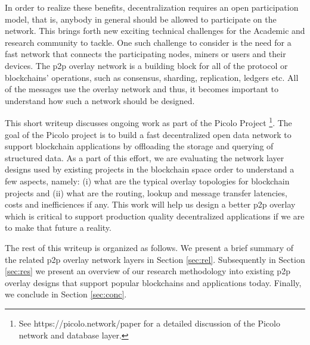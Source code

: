 \documentclass[journal]{IEEEtran}
\begin{document}
In order to realize these benefits, decentralization requires an open participation model, that is, anybody in general
should be allowed to participate on the network. This brings forth new exciting technical challenges for the Academic
and research community to tackle. One such challenge to consider is the need for a fast network that connects the
participating nodes, miners or users and their devices. The p2p overlay network \cite{p2p_survey}
is a building block for all of the protocol or blockchains' operations, such as consensus, sharding, replication,
ledgers etc. All of the messages use the overlay network and thus, it becomes important to understand how such
a network should be designed.

This short writeup discusses ongoing work as part of the Picolo Project \footnote{See https://picolo.network/paper for
a detailed discussion of the Picolo network and database layer.}. The goal of the Picolo project is
to build a fast decentralized open data network to support blockchain applications by offloading the storage and
querying of structured data. As a part of this effort, we are evaluating the network layer designs used by existing
projects in the blockchain space order to understand a few aspects, namely: (i) what are the typical overlay topologies
for blockchain projects and (ii) what are the routing, lookup and message transfer latencies, costs and inefficiences if
any. This work will help us design a better p2p overlay which is critical to support production quality decentralized
applications if we are to make that future a reality.

The rest of this writeup is organized as follows. We present a brief summary of the related p2p overlay network layers
in Section \ref{sec:rel}. Subsequently in Section \ref{sec:res} we present an overview of our research methodology into
existing p2p overlay designs that support popular blockchains and applications today. Finally, we conclude in Section
\ref{sec:conc}.

% 
% 
% 
% 
\end{document}
